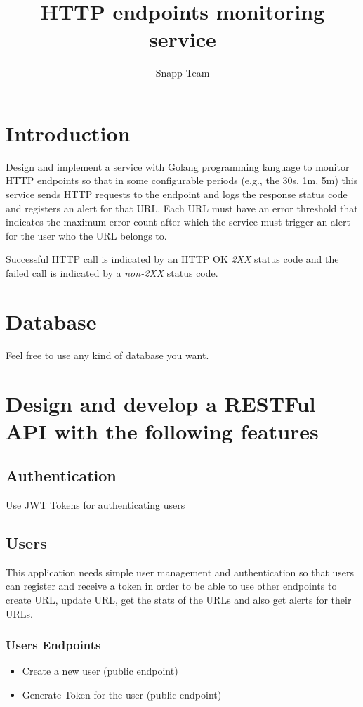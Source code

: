 \documentclass{article}
\begin{document}
\title{HTTP endpoints monitoring service}
\author{Snapp Team}

\maketitle
\tableofcontents

\section{Introduction}
Design and implement a service with Golang programming language to monitor HTTP endpoints so that in some configurable periods (e.g., the 30s, 1m, 5m)
this service sends HTTP requests to the endpoint and logs the response status code and registers an alert for that URL.
Each URL must have an error threshold that indicates the maximum error count after which the service must trigger an alert for the user who the URL belongs to.

Successful HTTP call is indicated by an HTTP OK \textit{2XX} status code and the failed call is indicated by a \textit{non-2XX} status code.

\section{Database}

Feel free to use any kind of database you want.

\section{Design and develop a RESTFul API with the following features}
\subsection{Authentication}
Use JWT Tokens for authenticating users

\subsection{Users}
This application needs simple user management and authentication so that users can register and receive a token in order to be able to use other endpoints to create URL, update URL, get the stats of the URLs and also get alerts for their URLs.

\subsubsection{Users Endpoints}
\begin{itemize}
  \item Create a new user (public endpoint)
  \item Generate Token for the user (public endpoint)
\end{itemize}
\end{document}
